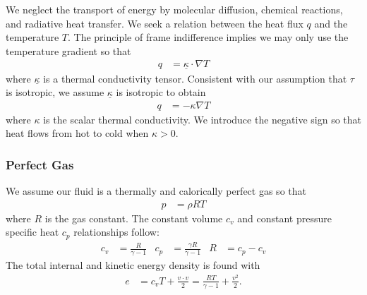 \documentclass[letterpaper,11pt,nointlimits]{amsart}
\begin{document}
We neglect the transport of energy by molecular diffusion, chemical
reactions, and radiative heat transfer.  We seek a relation between
the heat flux $q$ and the temperature $T$.  The principle of 
frame indifference implies we may only use the temperature gradient
so that
\begin{align}
  \label{eq:fouriertensorlaw}
  q &= \underline{\kappa} \cdot \nabla{} T
\end{align}
where $\underline{\kappa}$ is a thermal conductivity tensor.  
Consistent with our assumption that $\tau$ is isotropic, we assume
$\underline{\kappa}$ is isotropic to obtain 
\begin{align}
  \label{eq:fourierlaw}
  q &= - \kappa \nabla{} T
\end{align}
where $\kappa$ is the scalar thermal conductivity.  We introduce the
negative sign so that heat flows from hot to cold when $\kappa>0$.

\subsubsection{Perfect Gas}

We assume our fluid is a thermally and calorically perfect gas so that
\begin{align}
  \label{eq:perfectgas}
  p &= \rho{} R T
\end{align}
where $R$ is the gas constant. The constant volume $c_{v}$ and constant
pressure specific heat $c_{p}$ relationships follow:
\begin{align}
  \label{eq:perfectgasspecificheats}
  c_{v} &= \frac{R}{\gamma - 1}
  &
  c_{p} &= \frac{\gamma{}R}{\gamma-1}
  &
  R &= c_{p} - c_{v}
\end{align}
The total internal and kinetic energy density is found with
\begin{align}
  \label{eq:perfectgastotalenergy}
  e &= c_{v} T + \frac{v\cdot{}v}{2}
     = \frac{RT}{\gamma-1} + \frac{v^{2}}{2}
  .
\end{align}
\end{document}
